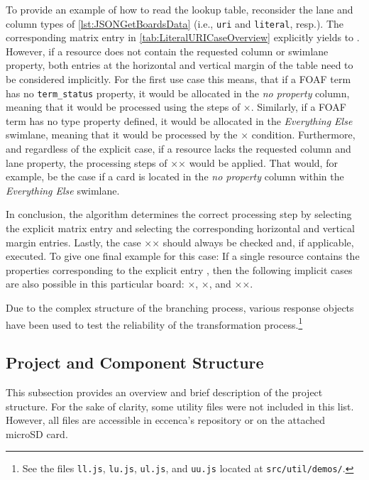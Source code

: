\newpage

\noindent To provide an example of how to read the lookup table, reconsider the lane and column types of \autoref{lst:JSONGetBoardsData} (i.e., \texttt{uri} and \texttt{literal}, resp.). The corresponding matrix entry in \autoref{tab:LiteralURICaseOverview} explicitly yields to . However, if a resource does not contain the requested column or swimlane property, both entries at the horizontal and vertical margin of the table need to be considered implicitly. For the first use case this means, that if a \acrshort*{FOAF} term has no \texttt{term\_status} property, it would be allocated in the \textit{no property} column, meaning that it would be processed using the steps of ×. Similarly, if a \acrshort*{FOAF} term has no type property defined, it would be allocated in the \textit{Everything Else} swimlane, meaning that it would be processed by the × condition. Furthermore, and regardless of the explicit case, if a resource lacks the requested column and lane property, the processing steps of ×× would be applied. That would, for example, be the case if a card is located in the \textit{no property} column within the \textit{Everything Else} swimlane.

In conclusion, the algorithm determines the correct processing step by selecting the explicit matrix entry and selecting the corresponding horizontal and vertical margin entries. Lastly, the case ×× should always be checked and, if applicable, executed. To give one final example for this case: If a single resource contains the properties corresponding to the explicit entry , then the following implicit cases are also possible in this particular board: ×, ×, and ××.

Due to the complex structure of the branching process, various response objects have been used to test the reliability of the transformation process.\footnote{See the files \texttt{ll.js}, \texttt{lu.js}, \texttt{ul.js}, and \texttt{uu.js} located at \texttt{src/util/demos/}.}




\subsection{Project and Component Structure}\label{ssec:ComponentStructure}

This subsection provides an overview and brief description of the project structure. For the sake of clarity, some utility files were not included in this list. However, all files are accessible in eccenca’s repository or on the attached microSD card.

